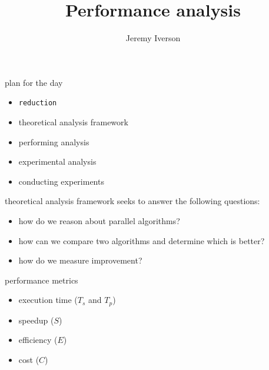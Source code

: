 \documentclass[10pt, t]{beamer}
\title{Performance analysis}
\date{}
\author{Jeremy Iverson}
\institute{College of Saint Benedict \& Saint John's University}
\begin{document}
  \begin{frame}
    \titlepage
  \end{frame}

  \begin{frame}{plan for the day}
    \begin{itemize}
      \item \texttt{reduction}
      \item theoretical analysis framework
      \item performing analysis
      \item experimental analysis
      \item conducting experiments
    \end{itemize}
  \end{frame}

  \begin{frame}{theoretical analysis framework}
    seeks to answer the following questions:
    \begin{itemize}
      \item how do we reason about parallel algorithms?
      \item how can we compare two algorithms and determine which is better?
      \item how do we measure improvement?
    \end{itemize}
  \end{frame}

  \begin{frame}{performance metrics}
    \begin{itemize}
      \item execution time ($T_s$ and $T_p$)
      \item speedup  ($S$)
      \item efficiency ($E$)
      \item cost ($C$)
    \end{itemize}
  \end{frame}
\end{document}
